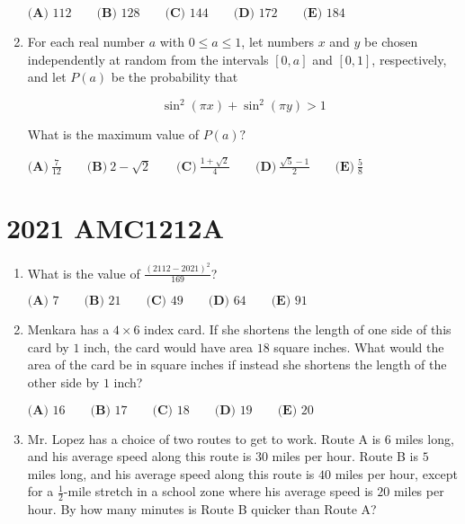 \documentclass{article}
\begin{document}
\begin{enumerate}[label=\arabic*., itemsep=0.5em]
$\textbf{(A) } 112 \qquad\textbf{(B) } 128 \qquad\textbf{(C) } 144 \qquad\textbf{(D) } 172 \qquad\textbf{(E) } 184$\par \vspace{0.5em}\item For each real number $a$ with $0 \leq a \leq 1$, let numbers $x$ and $y$ be chosen independently at random from the intervals $[0, a]$ and $[0, 1]$, respectively, and let $P(a)$ be the probability that


\begin{equation*}
\sin^2{(\pi x)} + \sin^2{(\pi y)} > 1
\end{equation*}

What is the maximum value of $P(a)?$

$\textbf{(A)}\ \frac{7}{12} \qquad\textbf{(B)}\ 2 - \sqrt{2} \qquad\textbf{(C)}\ \frac{1+\sqrt{2}}{4} \qquad\textbf{(D)}\ \frac{\sqrt{5}-1}{2} \qquad\textbf{(E)}\ \frac{5}{8}$\par \vspace{0.5em}\end{enumerate}\newpage\section*{2021 AMC1212A}\begin{enumerate}[label=\arabic*., itemsep=0.5em]\item What is the value of $\frac{(2112-2021)^2}{169}$?

$\textbf{(A) } 7 \qquad\textbf{(B) } 21 \qquad\textbf{(C) } 49 \qquad\textbf{(D) } 64 \qquad\textbf{(E) } 91$\par \vspace{0.5em}\item Menkara has a $4 \times 6$ index card. If she shortens the length of one side of this card by $1$ inch, the card would have area $18$ square inches. What would the area of the card be in square inches if instead she shortens the length of the other side by $1$ inch?

$\textbf{(A) }16\qquad\textbf{(B) }17\qquad\textbf{(C) }18\qquad\textbf{(D) }19\qquad\textbf{(E) }20$\par \vspace{0.5em}\item Mr. Lopez has a choice of two routes to get to work. Route A is $6$ miles long, and his average speed along this route is $30$ miles per hour. Route B is $5$ miles long, and his average speed along this route is $40$ miles per hour, except for a $\frac{1}{2}$-mile stretch in a school zone where his average speed is $20$ miles per hour. By how many minutes is Route B quicker than Route A?


\end{enumerate}
\end{document}
